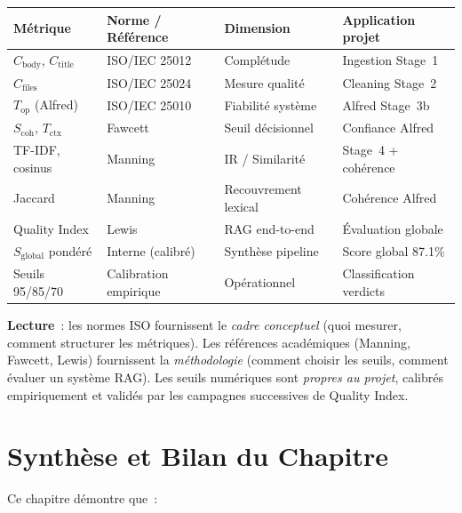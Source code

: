 \begin{longtable}{p{3cm}p{3.5cm}p{3cm}p{3.5cm}}
\toprule
\textbf{Métrique} & \textbf{Norme / Référence} & \textbf{Dimension} & \textbf{Application projet} \\
\midrule
$C_{\text{body}}$, $C_{\text{title}}$ & ISO/IEC 25012~\cite{iso25012} & Complétude & Ingestion Stage~1 \\
$C_{\text{files}}$ & ISO/IEC 25024~\cite{iso25024} & Mesure qualité & Cleaning Stage~2 \\
$T_{\text{op}}$ (Alfred) & ISO/IEC 25010~\cite{iso25010} & Fiabilité système & Alfred Stage~3b \\
$S_{\text{coh}}$, $T_{\text{ctx}}$ & Fawcett~\cite{fawcett2006roc} & Seuil décisionnel & Confiance Alfred \\
TF-IDF, cosinus & Manning~\cite{manning2008ir} & IR / Similarité & Stage~4 + cohérence \\
Jaccard & Manning~\cite{manning2008ir} & Recouvrement lexical & Cohérence Alfred \\
Quality Index & Lewis~\cite{lewis2020rag} & RAG end-to-end & Évaluation globale \\
$S_{\text{global}}$ pondéré & Interne (calibré) & Synthèse pipeline & Score global 87.1\% \\
Seuils 95/85/70 & Calibration empirique & Opérationnel & Classification verdicts \\
\bottomrule
\end{longtable}

\textbf{Lecture}~: les normes ISO fournissent le \textit{cadre conceptuel} (quoi mesurer, comment structurer les métriques). Les références académiques (Manning, Fawcett, Lewis) fournissent la \textit{méthodologie} (comment choisir les seuils, comment évaluer un système RAG). Les seuils numériques sont \textit{propres au projet}, calibrés empiriquement et validés par les campagnes successives de Quality Index.

\section{Synthèse et Bilan du Chapitre}
\label{sec:bilan_evaluation}

Ce chapitre démontre que~:

